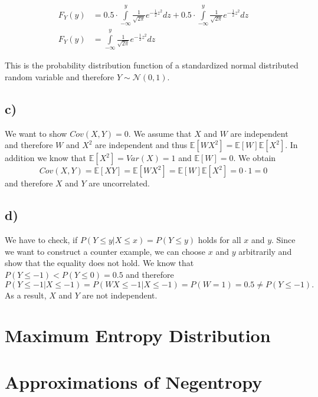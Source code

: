 \documentclass[paper=a4,fontsize=10pt,DIV11,BCOR10mm]{scrartcl}
\begin{document}
\begin{align*}
F_Y(y)&= 0.5 \cdot \int\limits_{-\infty}^{y} \frac{1}{\sqrt{2 \pi}} e^{-\frac{1}{2}z^2}dz+ 0.5 \cdot \int\limits_{-\infty}^{y} \frac{1}{\sqrt{2 \pi}} e^{-\frac{1}{2}z^2}dz\\
F_Y(y)&= \int\limits_{-\infty}^{y} \frac{1}{\sqrt{2 \pi}} e^{-\frac{1}{2}z^2}dz
\end{align*}

This is the probability distribution function of a standardized normal distributed random variable and therefore $Y\sim\mathcal{N}(0,1)$.

\subsection*{c)}
We want to show $Cov(X,Y)=0$. We assume that $X$ and $W$ are independent and therefore $W$ and $X^2$ are independent and thus $\mathbb{E}[WX^2]=\mathbb{E}[W]\mathbb{E}[X^2]$. In addition we know that $\mathbb{E}[X^2]=Var(X)=1$ and $\mathbb{E}[W]=0$. We obtain
\begin{equation*}
Cov(X,Y)=\mathbb{E}[XY]=\mathbb{E}[WX^2]=\mathbb{E}[W]\mathbb{E}[X^2]=0\cdot 1=0
\end{equation*}
and therefore $X$ and $Y$ are uncorrelated.


\subsection*{d)}
We have to check, if $P(Y\leq y|X \leq x)=P(Y \leq y)$ holds for all $x$ and $y$. Since we want to construct a counter example, we can choose $x$ and $y$ arbitrarily and show that the equality does not hold. We know that $ P(Y \leq -1)<P(Y \leq 0)=0.5$ and therefore
\begin{equation*}
P(Y\leq -1|X \leq -1)=P(WX \leq -1|X\leq -1)=P(W=1)=0.5\neq P(Y \leq -1).
\end{equation*}
As a result, $X$ and $Y$ are not independent.


\section{Maximum Entropy Distribution}



\section{Approximations of Negentropy}



\end{document}
